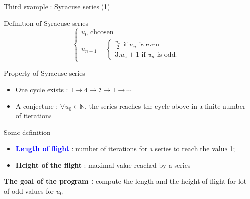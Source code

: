 \documentclass[compress,10pt,aspectratio=169]{beamer}
\begin{document}
\begin{frame}[fragile]{Third example : Syracuse series (1)}
\scriptsize 
\begin{block}{\small Definition of Syracuse series}
    \[
        \left\{
        \begin{array}{l}
            u_{0} \mbox{ choosen} \\
            u_{n+1} = \left\{
                \begin{array}{l}
                    \frac{u_{n}}{2} \mbox{ if } u_{n}\mbox{ is even}\\[1mm]
                    3.u_{n}+1 \mbox{ if } u_{n} \mbox{ is odd.}
                \end{array}
            \right.
        \end{array}
        \right.
    \]
\end{block}

\begin{exampleblock}{\small Property of Syracuse series}
    \begin{itemize}
        \item One cycle exists : $1 \rightarrow 4 \rightarrow 2 \rightarrow 1 \rightarrow \cdots$
        \item A conjecture : \alert{$\forall u_{0}\in \mathbb{N}$, 
              the series reaches the cycle above in a finite number of iterations}
    \end{itemize}
\end{exampleblock}

\begin{alertblock}{\small Some definition}
    \begin{itemize}
        \item \textcolor{blue}{\bf Length of flight} : number of iterations for a series to reach the value 1;
        \item \textcolor{NavyBlue}{\bf Height of the flight} : maximal value reached by a series
    \end{itemize}
\end{alertblock}
\begin{center}{\bf The goal of the program : } compute the length and the height of flight for lot of 
    odd values for $u_{0}$
\end{center}
\end{frame}
\end{document}
